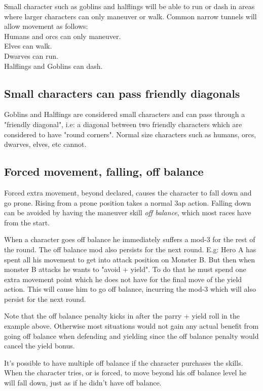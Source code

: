 Small character such as goblins and halflings will be able to run or dash in areas where larger characters can only maneuver or walk. 
Common narrow tunnels will allow movement as follows: \\
Humans and orcs can only maneuver. \\
Elves can walk. \\
Dwarves can run. \\
Halflings and Goblins can dash.


\subsection*{Small characters can pass friendly diagonals}
Goblins and Halflings are considered small characters and can pass through a "friendly diagonal", i.e: a diagonal between two friendly characters which are considered to have "round corners". 
Normal size characters such as humans, orcs, dwarves, elves, etc cannot.


\subsection*{Forced movement, falling, off balance}
Forced extra movement, beyond declared, causes the character to fall down and go prone. Rising from a prone position takes a normal 3ap action. Falling down can be avoided by having the maneuver skill \emph{off balance}, which most races have from the start.

When a character goes off balance he immediately suffers a mod-3 for the rest of the round. The off balance mod also persists for the next round. E.g: Hero A has spent all his movement to get into attack position on Monster B. But then when monster B attacks he wants to "avoid + yield". To do that he must spend one extra movement point which he does not have for the final move of the yield action. This will cause him to go off balance, incurring the mod-3 which will also persist for the next round.

Note that the off balance penalty kicks in after the parry + yield roll in the example above. Otherwise most situations would not gain any actual benefit from going off balance when defending and yielding since the off balance penalty would cancel the yield bonus.

It's possible to have multiple off balance if the character purchases the skills.
When the character tries, or is forced, to move beyond his off balance level he will fall down, just as if he didn't have off balance.


